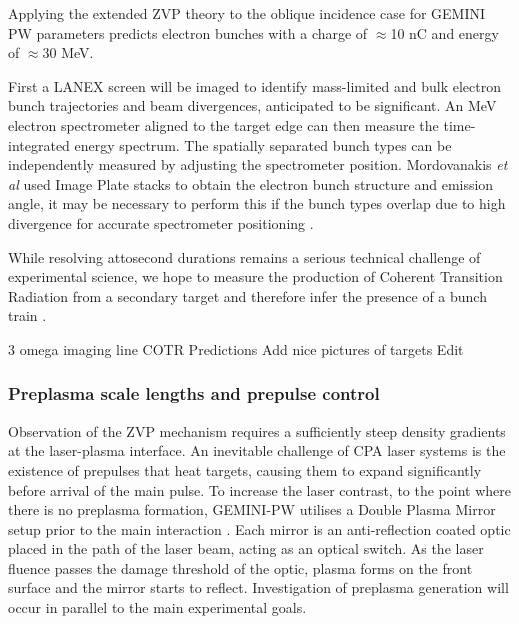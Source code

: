 Applying the extended ZVP theory to the oblique incidence case for GEMINI PW parameters predicts electron bunches with a charge of $\approx$10 nC and energy of $\approx$30 MeV.

First a LANEX screen will be imaged to identify mass-limited and bulk electron bunch trajectories and beam divergences, anticipated to be significant. An MeV electron spectrometer aligned to the target edge can then measure the time-integrated energy spectrum. The spatially separated bunch types can be independently measured by adjusting the spectrometer position. Mordovanakis \textit{et al} used Image Plate stacks to obtain the electron bunch structure and emission angle, it may be necessary to perform this if the bunch types overlap due to high divergence for accurate spectrometer positioning \cite{mordovanakisQuasimonoenergeticElectronBeams2009}. 

While resolving attosecond durations remains a serious technical challenge of experimental science, we hope to measure the production of Coherent Transition Radiation from a secondary target and therefore infer the presence of a bunch train \cite{linIsolatedAttosecondElectron2020}. 
 
 3 omega imaging line
 COTR
 Predictions
 Add nice pictures of targets
 Edit
 

\subsubsection{Preplasma scale lengths and prepulse control}
Observation of the ZVP mechanism requires a sufficiently steep density gradients at the laser-plasma interface. An inevitable challenge of \ac{CPA} laser systems is the existence of prepulses that heat targets, causing them to expand significantly before arrival of the main pulse. To increase the laser contrast, to the point where there is no preplasma formation, GEMINI-PW utilises a Double Plasma Mirror setup prior to the main interaction \cite{doumyCompleteCharacterizationPlasma2004}. Each mirror is an anti-reflection coated optic placed in the path of the laser beam, acting as an optical switch. As the laser fluence passes the damage threshold of the optic, plasma forms on the front surface and the mirror starts to reflect. Investigation of preplasma generation will occur in parallel to the main experimental goals.





